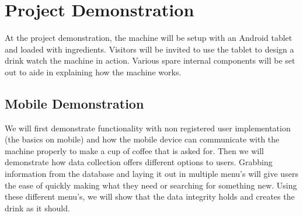\documentclass[conference]{IEEEtran}
\begin{document}
\section{Project Demonstration}
At the project demonstration, the machine will be setup with an Android tablet and loaded with ingredients.
Visitors will be invited to use the tablet to design a drink watch the machine in action. Various spare internal components
will be set out to aide in explaining how the machine works.

\subsection{Mobile Demonstration}
We will first demonstrate functionality with non registered user implementation (the basics on mobile)
 and how the mobile device can communicate with the machine properly to make a cup of coffee that is
  asked for. Then we will demonstrate how data collection offers different options to users. Grabbing 
  information from the database and laying it out in multiple menu's will give users the ease of quickly 
  making what they need or searching for something new. Using these different menu's, we will show 
  that the data integrity holds and creates the drink as it should. 
 

% 
% 

{}

\end{document}
